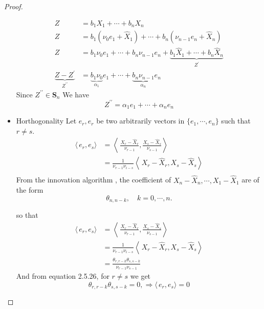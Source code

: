 \documentclass[11pt, oneside]{article}   	%
\begin{document}
\begin{proof}
\begin{itemize}
\begin{equation}
\begin{split}
Z &= b_{1}X_{1} + \cdots + b_{n}X_{n}\\
Z&=b_{1}(\nu_{0}e_{1} + \hat{X}_{1}) + \cdots + b_{n}(\nu_{n-1}e_{n} + \hat{X}_{n})\\
Z&=b_{1}\nu_{0}e_{1}  + \cdots + b_{n}\nu_{n-1}e_{n} + \underbrace{b_{1}\hat{X}_{1} + \cdots + b_{n}\hat{X}_{n}}_{Z^{\prime}}\\
\underbrace{Z-Z^{\prime}}_{Z^{\prime\prime}}&=\underbrace{b_{1}\nu_{0}}_{\alpha_{1}}e_{1}  + \cdots + \underbrace{b_{n}\nu_{n-1}}_{\alpha_{n}}e_{n} 
\end{split}
\end{equation} 
Since $Z^{\prime\prime} \in \textbf{S}_{n}$
We have 
\begin{equation}
Z^{\prime\prime} = \alpha_{1}e_{1}  + \cdots + \alpha_{n}e_{n} 
\end{equation}

\item Horthogonality
Let $e_{r}, e_{r}$ be two arbitrarily vectors in $\{ e_{1}, \cdots, e_{n}   \}$ such that $r \neq s$.
\begin{equation}
\begin{split}
\langle\,e_{r},e_{s}\rangle & = \left\langle\,\frac{X_{r}-\hat{X}_{r}}{\nu_{r-1}} ,\frac{X_{s}-\hat{X}_{s}}{\nu_{s-1}}\right\rangle\\
&=\frac{1}{\nu_{r-1}\nu_{i-s}}\left\langle\,X_{r}-\hat{X}_{r} ,X_{s}-\hat{X}_{s}\right\rangle\\
\end{split}
\end{equation}
From the innovation algorithm \cite{petter}, the coefficient of $X_{n}-\hat{X}_{n}, \cdots, X_{1}-\hat{X}_{1}$ are of the form 
\begin{equation}
\theta_{n,n-k}, \quad k=0, \cdots, n.
\end{equation}

so that 
\begin{equation}
\begin{split}
\langle\,e_{r},e_{s}\rangle & = \left\langle\,\frac{X_{r}-\hat{X}_{r}}{\nu_{r-1}} ,\frac{X_{s}-\hat{X}_{s}}{\nu_{s-1}}\right\rangle\\
&=\frac{1}{\nu_{r-1}\nu_{i-s}}\left\langle\,X_{r}-\hat{X}_{r} ,X_{s}-\hat{X}_{s}\right\rangle\\
&= \frac{\theta_{r,r-k} \theta_{s,s-k}}{\nu_{r-1}\nu_{s-1}}
\end{split}
\end{equation}
And from \cite{petter} equation 2.5.26, for $r\neq s$ we get 
\begin{equation}
\theta_{r,r-k} \theta_{s,s-k} = 0, \Rightarrow \langle\,e_{r},e_{s}\rangle = 0
\end{equation}




\end{itemize}
\end{proof}
\end{document}
